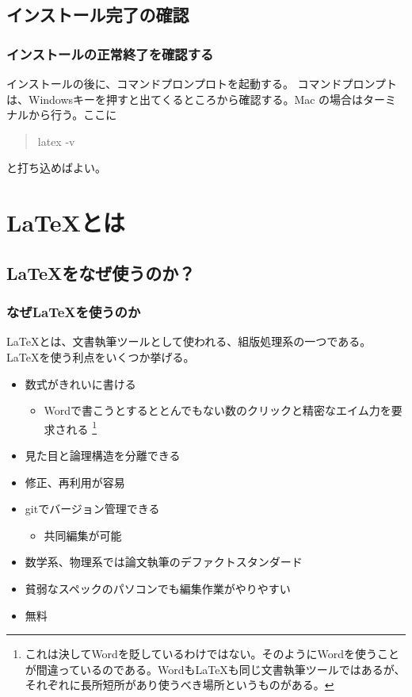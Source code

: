 \documentclass{beamer}
\begin{document}
\subsection{インストール完了の確認}
\begin{frame}
  \frametitle{インストールの正常終了を確認する}
  インストールの後に、コマンドプロンプロトを起動する。
  コマンドプロンプトは、Windowsキーを押すと出てくるところから確認する。Mac の場合はターミナルから行う。ここに
  \begin{quotation}
    latex -v
  \end{quotation}
  と打ち込めばよい。

\end{frame}

\section{\LaTeX とは}
\subsection{\LaTeX をなぜ使うのか？}
\begin{frame}
  \frametitle{なぜ\LaTeX を使うのか}
  \LaTeX とは、文書執筆ツールとして使われる、組版処理系の一つである。
\LaTeX を使う利点をいくつか挙げる。
\begin{itemize}
  \item 数式がきれいに書ける
  \begin{itemize}
    \item Wordで書こうとするととんでもない数のクリックと精密なエイム力を要求される
    \footnote{これは決してWordを貶しているわけではない。そのようにWordを使うことが間違っているのである。Wordも\LaTeX も同じ文書執筆ツールではあるが、それぞれに長所短所があり使うべき場所というものがある。}
  \end{itemize}
  \item 見た目と論理構造を分離できる
  \item 修正、再利用が容易
  \item gitでバージョン管理できる
  \begin{itemize}
    \item 共同編集が可能
  \end{itemize}
  \item 数学系、物理系では論文執筆のデファクトスタンダード
  \item 貧弱なスペックのパソコンでも編集作業がやりやすい
  \item 無料
\end{itemize}
  
\end{frame}
\end{document}
